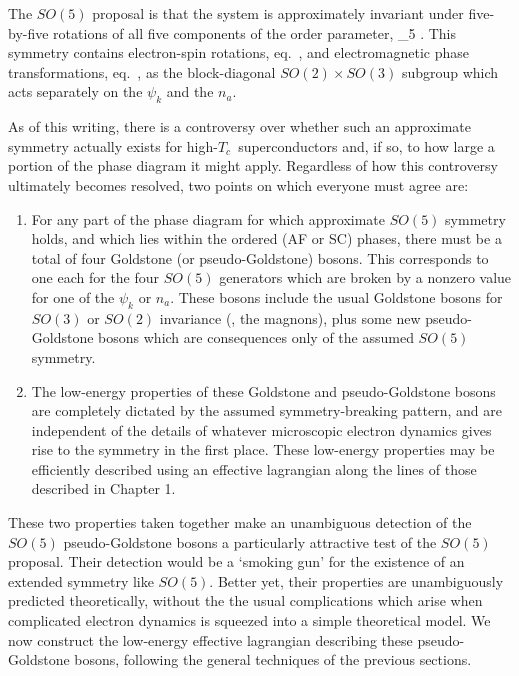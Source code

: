 \documentclass[12pt,epsf]{report}
\def\Tc{$T_c$}
\begin{document}
The $SO(5)$ proposal is that the system is approximately
invariant under five-by-five rotations of all five 
components of the order parameter,
%
\eq
\label{sofivedef}
 \to \Sco_5
\;  .
\eeq
%
This symmetry contains electron-spin rotations, 
eq.~, and electromagnetic phase
transformations, eq.~, as the
block-diagonal  $SO(2) \times SO(3)$ subgroup which acts
separately on the $\psi_k$ and the $n_a$.

As of this writing, there is a controversy over whether
such an approximate symmetry actually exists for  high-\Tc\
superconductors and, if so, to how large a  portion of the
phase diagram  it might apply. Regardless of how this
controversy ultimately becomes resolved,  two points on
which everyone must agree are:
%
\begin{enumerate}
\item
For any part of the phase diagram for which approximate
$SO(5)$ symmetry holds, and which lies within the ordered
(AF or SC) phases, there must be a total of four Goldstone
(or pseudo-Goldstone) bosons. This corresponds to one each
for the four $SO(5)$ generators which are broken by a
nonzero value for one of the $\psi_k$ or $n_a$. These
bosons include the usual Goldstone bosons for $SO(3)$ or
$SO(2)$ invariance (\eg, the magnons), plus some new
pseudo-Goldstone bosons which are consequences only of the
assumed $SO(5)$ symmetry.

\item
The low-energy properties of these Goldstone  and
pseudo-Goldstone bosons are completely dictated by the
assumed symmetry-breaking pattern, and  are independent of
the details of whatever microscopic electron dynamics gives
rise to the symmetry in the first place. These low-energy
properties may be efficiently described using an effective
lagrangian along the lines of those described in  Chapter 1.
%
\end{enumerate}
%
These two properties taken together make an unambiguous
detection of the $SO(5)$ pseudo-Goldstone bosons a
particularly attractive test of the $SO(5)$ proposal. Their
detection would be a `smoking gun' for the existence of an 
extended symmetry like $SO(5)$. Better yet, their
properties are unambiguously predicted theoretically,
without the  the usual complications which arise when
complicated electron dynamics is squeezed into a simple
theoretical model. We now construct the low-energy
effective lagrangian describing these pseudo-Goldstone
bosons, following the general techniques of the previous
sections.
\end{document}
